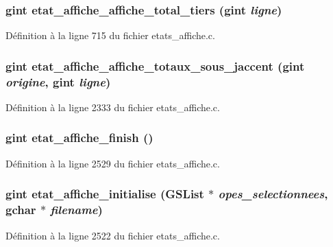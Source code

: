 \subsubsection[{etat\_\-affiche\_\-affiche\_\-total\_\-tiers}]{\setlength{\rightskip}{0pt plus 5cm}gint etat\_\-affiche\_\-affiche\_\-total\_\-tiers (gint {\em ligne})}\label{etats__affiche_8h_abfea10bc47fb122065847a8954dc21f1}


Définition à la ligne 715 du fichier etats\_\-affiche.c.

\subsubsection[{etat\_\-affiche\_\-affiche\_\-totaux\_\-sous\_\-jaccent}]{\setlength{\rightskip}{0pt plus 5cm}gint etat\_\-affiche\_\-affiche\_\-totaux\_\-sous\_\-jaccent (gint {\em origine}, \/  gint {\em ligne})}\label{etats__affiche_8h_ab745193ba95c3b3b507313d1e847218c}


Définition à la ligne 2333 du fichier etats\_\-affiche.c.

\subsubsection[{etat\_\-affiche\_\-finish}]{\setlength{\rightskip}{0pt plus 5cm}gint etat\_\-affiche\_\-finish ()}\label{etats__affiche_8h_aa8e4b00738bfd1c77cad02514cef3b5c}


Définition à la ligne 2529 du fichier etats\_\-affiche.c.

\subsubsection[{etat\_\-affiche\_\-initialise}]{\setlength{\rightskip}{0pt plus 5cm}gint etat\_\-affiche\_\-initialise (GSList $\ast$ {\em opes\_\-selectionnees}, \/  gchar $\ast$ {\em filename})}\label{etats__affiche_8h_a552210432a4f14d6ccef1cb78f3a57c8}


Définition à la ligne 2522 du fichier etats\_\-affiche.c.


